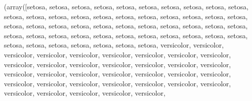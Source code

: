 \documentclass[letterpaper,10pt,english]{jupyterBook}
\begin{document}
\begin{sphinxVerbatimOutput}

\begin{sphinxVerbatim}[commandchars=\\\{\}]
(array([\PYGZsq{}setosa\PYGZsq{}, \PYGZsq{}setosa\PYGZsq{}, \PYGZsq{}setosa\PYGZsq{}, \PYGZsq{}setosa\PYGZsq{}, \PYGZsq{}setosa\PYGZsq{}, \PYGZsq{}setosa\PYGZsq{},
        \PYGZsq{}setosa\PYGZsq{}, \PYGZsq{}setosa\PYGZsq{}, \PYGZsq{}setosa\PYGZsq{}, \PYGZsq{}setosa\PYGZsq{}, \PYGZsq{}setosa\PYGZsq{}, \PYGZsq{}setosa\PYGZsq{},
        \PYGZsq{}setosa\PYGZsq{}, \PYGZsq{}setosa\PYGZsq{}, \PYGZsq{}setosa\PYGZsq{}, \PYGZsq{}setosa\PYGZsq{}, \PYGZsq{}setosa\PYGZsq{}, \PYGZsq{}setosa\PYGZsq{},
        \PYGZsq{}setosa\PYGZsq{}, \PYGZsq{}setosa\PYGZsq{}, \PYGZsq{}setosa\PYGZsq{}, \PYGZsq{}setosa\PYGZsq{}, \PYGZsq{}setosa\PYGZsq{}, \PYGZsq{}setosa\PYGZsq{},
        \PYGZsq{}setosa\PYGZsq{}, \PYGZsq{}setosa\PYGZsq{}, \PYGZsq{}setosa\PYGZsq{}, \PYGZsq{}setosa\PYGZsq{}, \PYGZsq{}setosa\PYGZsq{}, \PYGZsq{}setosa\PYGZsq{},
        \PYGZsq{}setosa\PYGZsq{}, \PYGZsq{}setosa\PYGZsq{}, \PYGZsq{}setosa\PYGZsq{}, \PYGZsq{}setosa\PYGZsq{}, \PYGZsq{}setosa\PYGZsq{}, \PYGZsq{}setosa\PYGZsq{},
        \PYGZsq{}setosa\PYGZsq{}, \PYGZsq{}setosa\PYGZsq{}, \PYGZsq{}setosa\PYGZsq{}, \PYGZsq{}setosa\PYGZsq{}, \PYGZsq{}setosa\PYGZsq{}, \PYGZsq{}setosa\PYGZsq{},
        \PYGZsq{}setosa\PYGZsq{}, \PYGZsq{}setosa\PYGZsq{}, \PYGZsq{}setosa\PYGZsq{}, \PYGZsq{}setosa\PYGZsq{}, \PYGZsq{}setosa\PYGZsq{}, \PYGZsq{}setosa\PYGZsq{},
        \PYGZsq{}setosa\PYGZsq{}, \PYGZsq{}setosa\PYGZsq{}, \PYGZsq{}versicolor\PYGZsq{}, \PYGZsq{}versicolor\PYGZsq{}, \PYGZsq{}versicolor\PYGZsq{},
        \PYGZsq{}versicolor\PYGZsq{}, \PYGZsq{}versicolor\PYGZsq{}, \PYGZsq{}versicolor\PYGZsq{}, \PYGZsq{}versicolor\PYGZsq{},
        \PYGZsq{}versicolor\PYGZsq{}, \PYGZsq{}versicolor\PYGZsq{}, \PYGZsq{}versicolor\PYGZsq{}, \PYGZsq{}versicolor\PYGZsq{},
        \PYGZsq{}versicolor\PYGZsq{}, \PYGZsq{}versicolor\PYGZsq{}, \PYGZsq{}versicolor\PYGZsq{}, \PYGZsq{}versicolor\PYGZsq{},
        \PYGZsq{}versicolor\PYGZsq{}, \PYGZsq{}versicolor\PYGZsq{}, \PYGZsq{}versicolor\PYGZsq{}, \PYGZsq{}versicolor\PYGZsq{},
        \PYGZsq{}versicolor\PYGZsq{}, \PYGZsq{}versicolor\PYGZsq{}, \PYGZsq{}versicolor\PYGZsq{}, \PYGZsq{}versicolor\PYGZsq{},
        \PYGZsq{}versicolor\PYGZsq{}, \PYGZsq{}versicolor\PYGZsq{}, \PYGZsq{}versicolor\PYGZsq{}, \PYGZsq{}versicolor\PYGZsq{},
        \PYGZsq{}versicolor\PYGZsq{}, \PYGZsq{}versicolor\PYGZsq{}, \PYGZsq{}versicolor\PYGZsq{}, \PYGZsq{}versicolor\PYGZsq{},
        \PYGZsq{}versicolor\PYGZsq{}, \PYGZsq{}versicolor\PYGZsq{}, \PYGZsq{}versicolor\PYGZsq{}, \PYGZsq{}versicolor\PYGZsq{},

\end{sphinxVerbatim}
\end{sphinxVerbatimOutput}
\end{document}
